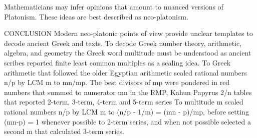 \documentclass[12pt]{article}
\begin{document}
Mathematicians may infer opinions that amount to nuanced versions of Platonism. These ideas are best described as neo-platonism.

CONCLUSION Modern neo-platonic points of view provide unclear templates to decode ancient Greek and  texts. To decode Greek number theory, arithmetic, algebra, and geometry the Greek word multitude must be understood as ancient scribes reported finite least common multiples as a scaling idea. To Greek arithmetic that followed the older Egyptian arithmetic scaled rational numbers n/p by LCM m to mn/mp. The best divisors of mp were pondered in red numbers that summed to numerator mn in the RMP, Kahun Papyrus 2/n tables that reported 2-term, 3-term, 4-term and 5-term series To  multitude m scaled rational numbers n/p by LCM m to (n/p - 1/m) = (mn - p)/mp, before setting (mn-p) = 1 whenever possible to 2-term series, and when not possible selected a second m that calculated 3-term series.   
\end{document}
